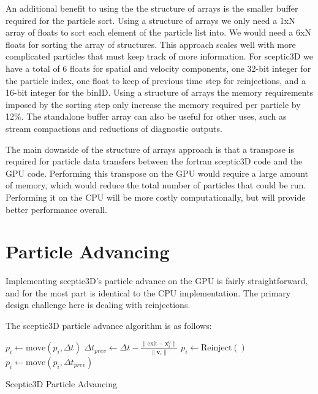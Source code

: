 An additional benefit to using the the structure of arrays is the smaller buffer required for the particle sort. Using a structure of arrays we only need a 1xN array of floats to sort each element of the particle list into. We would need a 6xN floats for sorting the array of structures. This approach scales well with more complicated particles that must keep track of more information. For sceptic3D we have a total of 6 floats for spatial and velocity components, one 32-bit integer for the particle index, one float to keep of previous time step for reinjections, and a 16-bit integer for the binID. Using a structure of arrays the memory requirements imposed by the sorting step only increase the memory required per particle by 12\%. The standalone buffer array can also be useful for other uses, such as stream compactions and reductions of diagnostic outputs. 

The main downside of the structure of arrays approach is that a transpose is required for particle data transfers between the fortran sceptic3D code and the GPU code. Performing this transpose on the GPU would require a large amount of memory, which would reduce the total number of particles that could be run. Performing it on the CPU will be more costly computationally, but will provide better performance overall.  




	\section{Particle Advancing}
	Implementing sceptic3D's particle advance on the GPU is fairly straightforward, and for the most part is identical to the CPU implementation. The primary design challenge here is dealing with reinjections.

The sceptic3D particle advance algorithm is as follows:

\begin{algorithm}
	\begin{algorithmic}
		\STATE $p_i \leftarrow \mathrm{move}(p_i,\Delta t)$
			\STATE $\Delta t_{prev} \leftarrow \Delta t - \frac{\|\mathbf{\mathrm{exit}} - \mathbf{x}_i^0\|}{\|\mathbf{v}_i\|}$
			\STATE $p_i \leftarrow \mathrm{Reinject}()$
			\STATE $p_i \leftarrow \mathrm{move}(p_i,\Delta t_{prev})$
		\ENDWHILE	
		\ENDFOR
	\end{algorithmic}
	\caption{Sceptic3D Particle Advancing}
	\label{alg:padvnc}
\end{algorithm}

